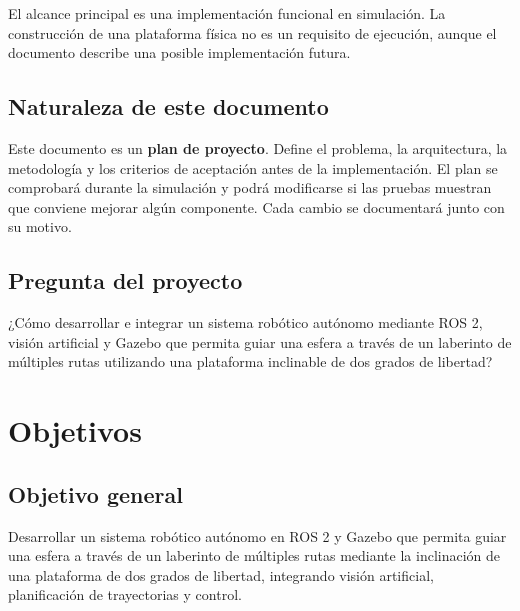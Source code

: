 \documentclass[11pt,a4paper]{article}
\begin{document}
El alcance principal es una implementación funcional en simulación. La construcción de una plataforma física no es un requisito de ejecución, aunque el documento describe una posible implementación futura.

\subsection{Naturaleza de este documento}
Este documento es un \textbf{plan de proyecto}. Define el problema, la arquitectura, la metodología y los criterios de aceptación antes de la implementación. El plan se comprobará durante la simulación y podrá modificarse si las pruebas muestran que conviene mejorar algún componente. Cada cambio se documentará junto con su motivo.

\subsection{Pregunta del proyecto}
¿Cómo desarrollar e integrar un sistema robótico autónomo mediante ROS 2, visión artificial y Gazebo que permita guiar una esfera a través de un laberinto de múltiples rutas utilizando una plataforma inclinable de dos grados de libertad?

\section{Objetivos}

\subsection{Objetivo general}
Desarrollar un sistema robótico autónomo en ROS 2 y Gazebo que permita guiar una esfera a través de un laberinto de múltiples rutas mediante la inclinación de una plataforma de dos grados de libertad, integrando visión artificial, planificación de trayectorias y control.
\end{document}
